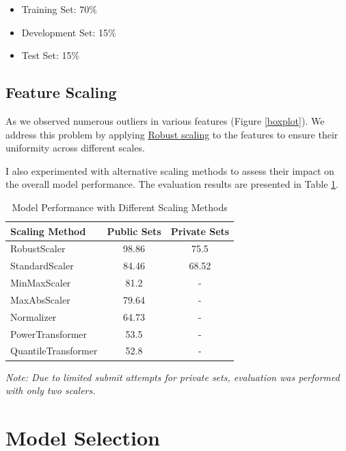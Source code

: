 \documentclass[conference]{IEEEtran}
\begin{document}
\begin{itemize}
    \item Training Set: 70\%
    \item Development Set: 15\%
    \item Test Set: 15\%
\end{itemize}

\subsection{Feature Scaling}
As we observed numerous outliers in various features (Figure \ref{boxplot}). We address this problem by applying \href{https://scikit-learn.org/stable/modules/generated/sklearn.preprocessing.RobustScaler.html}{Robust scaling} to the features to ensure their uniformity across different scales. 

I also experimented with alternative scaling methods to assess their impact on the overall model performance. The evaluation results are presented in Table \ref{tab:model_performance}.

\begin{table}[h]
    \centering
    \caption{Model Performance with Different Scaling Methods}
    \begin{tabular}{lcc}
    \toprule
    \textbf{Scaling Method} & \textbf{Public Sets} & \textbf{Private Sets} \\
    \midrule
    RobustScaler & 98.86 & 75.5 \\
    StandardScaler & 84.46 & 68.52 \\
    MinMaxScaler & 81.2 & - \\
    MaxAbsScaler & 79.64 & - \\
    Normalizer & 64.73 & - \\
    PowerTransformer & 53.5 & - \\
    QuantileTransformer & 52.8 & - \\
    \bottomrule
    \end{tabular}
    \begin{flushleft}
        \small\textit{Note: Due to limited submit attempts for private sets, evaluation was performed with only two scalers.}
        \end{flushleft}
    \label{tab:model_performance}
    \end{table}
    
\section{Model Selection}
\end{document}

